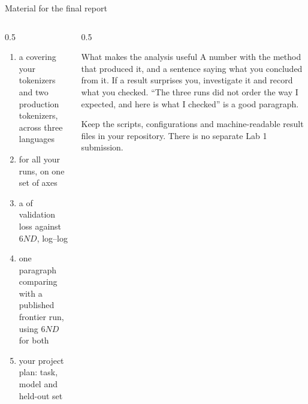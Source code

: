 \documentclass[aspectratio=169,10pt]{beamer}
\begin{document}
\begin{frame}{Material for the final report}
  \begin{columns}[T]
    \begin{column}{0.5\textwidth}
      \begin{enumerate}
        \item a  covering your tokenizers and two
          production tokenizers, across three languages
        \item {} for all your runs, on one set of axes
        \item a  of validation loss against $6ND$, log--log
        \item one paragraph comparing  with a published
          frontier run, using $6ND$ for both
        \item your project plan: task, model and held-out set
      \end{enumerate}
    \end{column}
    \begin{column}{0.5\textwidth}
      \begin{block}{What makes the analysis useful}
        \small
        A number with the method that produced it, and a sentence saying what
        you concluded from it.
        \vspace{0.4em}
        If a result surprises you, investigate it and record what you checked.
        \vspace{0.4em}
        ``The three runs did not order the way I expected, and here is what I
        checked'' is a good paragraph.
      \end{block}
      \vspace{0.3em}
      \small
      Keep the scripts, configurations and machine-readable result files in
      your repository. There is no separate Lab 1 submission.
    \end{column}
  \end{columns}
\end{frame}
\end{document}

